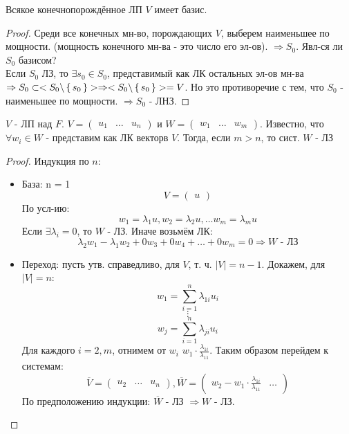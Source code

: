 \begin{statement}
Всякое конечнопорождённое ЛП $V$ имеет базис.
\end{statement}
\begin{proof}
Среди все конечных мн-во, порождающих $V$, выберем наименьшее по мощности. (мощность конечного мн-ва - это число его эл-ов). $\Rightarrow S_0$. Явл-ся ли $S_0$ базисом? \\

Если $S_0$ ЛЗ, то $\exists s_0 \in S_0$, представимый как ЛК остальных эл-ов мн-ва $\Rightarrow S_0 \subset <S_0 \backslash \set{s_0}> \Rightarrow <S_0 \backslash \set{s_0}> = V$. Но это противоречие с тем, что $S_0$ - наименьшее по мощности. $\Rightarrow S_0$ - ЛНЗ.
\end{proof}
\begin{statement}
  $V$ - ЛП над $F$. $V = \begin{pmatrix} u_1 & \ldots & u_n \end{pmatrix}$ и $W = \begin{pmatrix}w_1 & \ldots & w_m \end{pmatrix}$. Известно, что $\forall w_i \in W$ - представим как ЛК векторв $V$. Тогда, если $m > n$, то сист. $W$ - ЛЗ 
\end{statement}
\begin{proof}
Индукция по $n$:
\begin{itemize}
  \item База: n = 1
\[
V = \begin{pmatrix} u \end{pmatrix}
\]
По усл-ию:
\[
w_1 = \lambda_1 u, w_2 = \lambda_2 u, \ldots w_m = \lambda_m u
\]
Если $\exists \lambda_i = 0$, то $W$ - ЛЗ. Иначе возьмём ЛК:
\[
\lambda_2 w_1 - \lambda_1 w_2 + 0w_3 + 0w_4 + \ldots + 0w_m = 0 \Rightarrow W \text{ - ЛЗ}
\]
  \item Переход: пусть утв. справедливо, для $V$, т. ч. $|V| = n - 1$. Докажем, для $|V| = n$:
    \[
    w_1 = \sum_{i = 1}^{n} \lambda_{1i} u_i
    \]
    \[
    \vdots
    \]
    \[
    w_j = \sum_{i = 1}^{n} \lambda_{ji} u_i
    \]
    Для каждого $i = 2, m$, отнимем от $w_i$ $w_1 \cdot \frac{\lambda_{1i}}{\lambda_{11}}$. Таким образом перейдем к системам:
    \[
      \overline{V} = \begin{pmatrix}u_2 & \ldots & u_n \end{pmatrix}, \overline{W} = \begin{pmatrix}w_2 - w_1 \cdot \frac{\lambda_{1i}}{\lambda_{11}} & \ldots \end{pmatrix}
    \]
    По предположению индукции: $\overline{W}$ - ЛЗ $\Rightarrow W$ - ЛЗ.
\end{itemize}
\end{proof}
